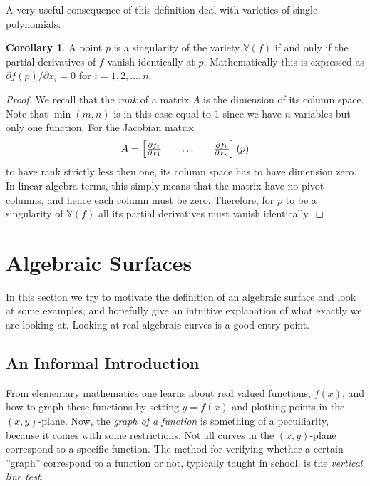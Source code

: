 \documentclass{article}
\theoremstyle{definition}
\newtheorem{corollary}{Corollary}
\newcommand{\V}{\mathbb{V}}
\begin{document}
A very useful consequence of this definition deal with varieties of single
polynomials.
\begin{corollary}
    \label{crl:single_poly}
    A point $p$ is a singularity of the variety $\V(f)$ if and only if the
    partial derivatives of $f$ vanish identically at $p$. Mathematically this
    is expressed as ${\partial f(p)}/{\partial x_i} = 0$ for $i = 1, 2, \ldots,
    n$.
\end{corollary}
\begin{proof}
    We recall that the \emph{rank} of a matrix $A$ is the dimension of its
    column space. Note that $\min(m, n)$ is in this case equal to $1$ since we
    have $n$ variables but only one function.
    For the Jacobian matrix
    \begin{equation}
        \notag
        A = \begin{bmatrix}
            \frac{\partial f_1}{\partial x_1} && \hdots && \frac{\partial f_1}{\partial x_n}
        \end{bmatrix}(p)
    \end{equation} 
    to have rank strictly less then one, its column space has to have dimension
    zero. In linear algebra terms, this simply means that the matrix have no
    pivot columns, and hence each column must be zero. Therefore, for $p$ to be
    a singularity of $\V(f)$ all its partial derivatives must vanish
    identically.
\end{proof}


\section{Algebraic Surfaces}
\label{sec:algebraic_surfaces}

In this section we try to motivate the definition of an algebraic surface and
look at some examples, and hopefully give an intuitive explanation of what
exactly we are looking at. Looking at real algebraic curves is a good entry
point.

\subsection{An Informal Introduction}
\label{sub:an_informal_introduction}

From elementary mathematics one learns about real valued functions, $f(x)$, and
how to graph these functions by setting $y = f(x)$ and plotting points in the
$(x, y)$-plane. Now, the \emph{graph of a function} is something of a
pecuiliarity, because it comes with some restrictions. Not all curves in the
$(x, y)$-plane correspond to a specific function. The method for verifying
whether a certain ''graph'' correspond to a function or not, typically taught
in school, is the \emph{vertical line test}. 
\end{document}
